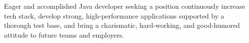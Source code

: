 

\begin{cvparagraph}
Eager and accomplished Java developer seeking a position continuously increase tech stack, develop strong, high-performance applications supported by a thorough test base, and bring a charismatic, hard-working, and good-humored attitude to future teams and employers.
\end{cvparagraph}
\vspace{-5pt}